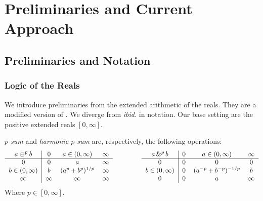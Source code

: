 \section{Preliminaries and Current Approach} \label{section:CurrentApproach}

\subsection{Preliminaries and Notation}

\subsubsection{Logic of the Reals}
We introduce preliminaries from the extended arithmetic of the reals. They are a modified version of \cite{capucci2024quantifiers}. We diverge from \emph{ibid.} in notation. Our base setting are the positive extended reals $[0,\infty]$. %

\begin{definition}[$p$-Sum]
\label{$p$-Sum}
    \emph{$p$-sum} and \emph{harmonic $p$-sum} are, respectively, the following operations:
    \begin{equation*}
		\begin{tabular}{c|ccc}
			$a \psum{p} b$ & $0$ & $a \in (0,\infty)$ & $\infty$\\
			\cline{1-4}
			$0$ 			   & $0$ & $a$ 		& $\infty$\\
			$b \in (0,\infty)$ & $b$ & $(a^{p}+b^{p})^{1/p}$		& $\infty$\\
			$\infty$ 		   & $\infty$ & $\infty$ & $\infty$
		\end{tabular}
		\hspace*{10ex}
		\begin{tabular}{c|ccc}
			\textnormal{$a \phsum{p} b$} & $0$ & $a \in (0,\infty)$ & $\infty$\\
			\cline{1-4}
			$0$ 		 	   & $0$ 		& $0$ 	   & $0$\\
			$b \in (0,\infty)$ & $0$ 		& $(a^{-p}+b^{-p})^{-1/p}$	   & $b$\\
			$0$ 		   & $0$ 	& $a$ & $\infty$
		\end{tabular}
	\end{equation*}
    Where $p \in [0,\infty].$
\end{definition}

